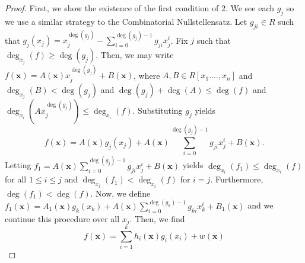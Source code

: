 \begin{proof}
	First, we show the existence of the first condition of \(2\). We see each \(g_{j}\) so we use a similar strategy to the Combinatorial Nullstellensatz. Let \(g_{ji} \in R\) such that \(g_{j}\left( x_{j} \right) = x_{j}^{\deg \left( g_{j} \right) }  - \sum_{i=0}^{\deg \left( g_{j} \right) - 1 }g_{ji} x_{j}^{i}\). Fix \(j\) such that \(\deg _{x_{j}} \left(  f \right) \ge \deg \left( g_{j} \right)  \). Then, we may write \(f\left( \textbf{x} \right) = A\left( \textbf{x} \right) x_{j}^{\deg \left( g_{j} \right) } + B\left( \textbf{x} \right) \), where \(A, B \in R\left[ x_1. \ldots, x_{n} \right] \) and \(\deg _{x_{j}} \left( B \right)  < \deg \left( g_{j} \right) \) and \(\deg \left( g_{j} \right) + \deg \left( A \right)  \le \deg \left( f \right)  \) and \(\deg _{x_{i}} \left( Ax_{j}^{\deg \left( g_{j} \right) } \right) \le \deg _{x_{i}} \left(  f \right) \). Substituting \(g_{j}\) yields \[
		f\left( \textbf{x} \right) = A\left( \textbf{x} \right)  g_{j} \left( x_j \right)  +   A\left( \textbf{x} \right)\sum_{i=0}^{\deg \left( g_{j} \right) - 1 }g_{ji}x_{j}^{i} + B\left( \textbf{x} \right)
	.\]
	Letting \(f_1 = A\left( \textbf{x} \right)  \sum_{i=0}^{\deg \left( g_{j} \right) - 1} g_{ji}x_{j}^i + B\left( \textbf{x} \right)\) yields \(\deg _{x_{i}} \left(  f_1 \right) \le \deg _{x_{i}} \left(  f \right) \) for all \(1 \le i \le j\) and \(\deg _{x_{i}} \left( f_1 \right) < \deg _{x_{i}} \left(  f \right) \) for \(i = j\). Furthermore, \(\deg \left( f_1 \right)  < \deg \left( f \right) \). Now, we define \(f_1 \left( \textbf{x} \right)  = A_1\left( \textbf{x}\right) g_{k}\left( x_{k}   \right) + A\left( \textbf{x} \right) \sum_{i=0}^{\deg \left( g_{k} \right) - 1 } g_{ki}x_{k}^{i}  + B_1\left( \textbf{x} \right) \) and we continue this procedure over all \(x_{j}\). Then, we find \[
			f\left( \textbf{x} \right) = \sum_{i= 1}^{k} h_{i}\left( \textbf{x} \right) g_{i}\left( x_{i} \right)  + w\left( \textbf{x} \right)
		\]
	\end{proof}
